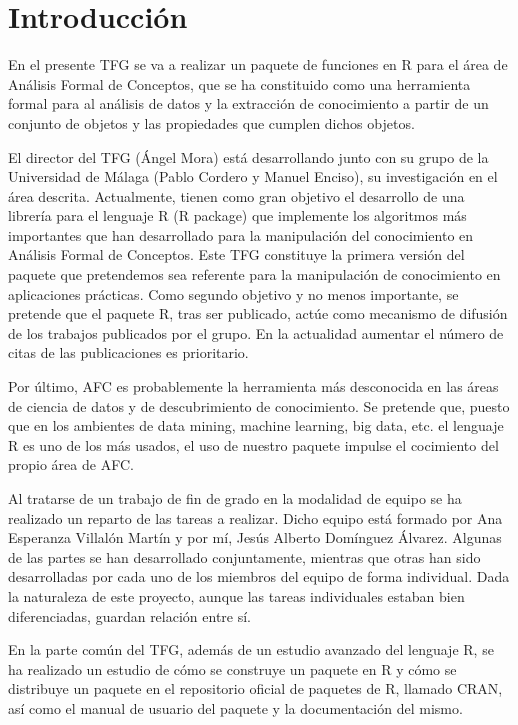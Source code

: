 \section{Introducci\'on}

En el presente TFG se va a realizar un paquete de funciones en R para el \'area de An\'alisis Formal de Conceptos, que se ha constituido como una herramienta formal para al an\'alisis de datos y la extracci\'on de conocimiento a partir de un conjunto de objetos y las propiedades que cumplen dichos objetos.

El director del TFG (\'Angel Mora) est\'a desarrollando junto con su grupo de la Universidad de M\'alaga (Pablo Cordero y Manuel Enciso), su investigaci\'on en el \'area descrita. Actualmente, tienen como gran objetivo el desarrollo de una librer\'ia para el lenguaje R (R package) que implemente los algoritmos m\'as importantes que han desarrollado para la manipulaci\'on del conocimiento en  An\'alisis Formal de Conceptos. Este TFG constituye la primera versi\'on del paquete que pretendemos sea referente para la manipulaci\'on de conocimiento en aplicaciones pr\'acticas. Como segundo objetivo y no menos importante, se pretende que el paquete R, tras ser publicado, act\'ue como mecanismo de difusi\'on de los trabajos publicados por el grupo. En la actualidad aumentar el n\'umero de citas de las publicaciones es prioritario. 

Por \'ultimo, AFC es probablemente la herramienta m\'as desconocida en las \'areas de ciencia de datos y de descubrimiento de conocimiento. Se pretende que, puesto que en los ambientes de data mining, machine learning, big data, etc. el lenguaje R es uno de los m\'as usados, el uso de nuestro paquete impulse el cocimiento del propio \'area de AFC.

Al tratarse de un trabajo de fin de grado en la modalidad de equipo se ha realizado un reparto de las tareas a realizar. Dicho equipo est\'a formado por Ana Esperanza Villal\'on Mart\'in y por m\'i, Jes\'us Alberto Dom\'inguez \'Alvarez. Algunas de las partes se han desarrollado conjuntamente, mientras que otras han sido desarrolladas por cada uno de los miembros del equipo de forma individual. Dada la naturaleza de este proyecto, aunque las tareas individuales estaban bien diferenciadas, guardan relaci\'on entre s\'i.

En la parte com\'un del TFG, adem\'as de un estudio avanzado del lenguaje R, se ha realizado un estudio de c\'omo se construye un paquete en R y c\'omo se distribuye un paquete en el repositorio oficial de paquetes de R, llamado CRAN, as\'i como el manual de usuario del paquete y la documentaci\'on del mismo.

